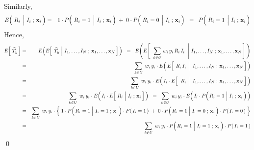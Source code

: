 Similarly,
\begin{eqnarray*}
E\!\left(\,\left.\overset{{\color{white}.}}{R_{i}}\;\,\right\vert\,I_{i}\;;\,\mathbf{x}_{i}\,\right)
& = &
	1 \cdot P\!\left(\,\left.\overset{{\color{white}.}}{R_{i}}=1\;\,\right\vert\,I_{i}\;;\,\mathbf{x}_{i}\,\right)
	\; + \;
	0 \cdot P\!\left(\,\left.\overset{{\color{white}.}}{R_{i}}=0\;\,\right\vert\,I_{i}\;;\,\mathbf{x}_{i}\,\right)
\;\; = \;\;
	P\!\left(\,\left.\overset{{\color{white}.}}{R_{i}}=1\;\,\right\vert\,I_{i}\;;\,\mathbf{x}_{i}\,\right)
\end{eqnarray*}
Hence,
\begin{eqnarray*}
E\!\left[\;\widehat{T}_{y}\,\right]
& = &
	E\!\left(E\!\left[\;
		\left.\widehat{T}_{y}\;\right\vert\,I_{1},\ldots,I_{N}
		\;;\,\mathbf{x}_{1},\ldots,\mathbf{x}_{N}
		\,\right]\,\right)
\;\; = \;\;
	E\!\left(E\!\left[\;\,
		\left.\underset{k \in U}{\sum}\;w_{i}\,y_{i}\,R_{i}\,I_{i}\;\;\right\vert\,I_{1},\ldots,I_{N}
		\;;\,\mathbf{x}_{1},\ldots,\mathbf{x}_{N}
		\,\right]\,\right)
\\
& = &
	\underset{k \in U}{\sum}\;\,w_{i}\,y_{i}
	\cdot
	E\!\left(\,E\!\left[\;
		\left.\overset{{\color{white}.}}{R_{i}\,I_{i}}\;\;\right\vert\,I_{1},\ldots,I_{N}
		\;;\,\mathbf{x}_{1},\ldots,\mathbf{x}_{N}
		\,\right]\,\right)
\\
& = &
	\underset{k \in U}{\sum}\;\,w_{i}\,y_{i}
	\cdot
	E\!\left(\,I_{i} \cdot E\!\left[\;
		\left.\,\overset{{\color{white}.}}{R_{i}}\;\;\right\vert\,I_{1},\ldots,I_{N}
		\;;\,\mathbf{x}_{1},\ldots,\mathbf{x}_{N}
		\,\right]\,\right)
\\
& = &
	\underset{k \in U}{\sum}\;\,w_{i}\,y_{i}
	\cdot
	E\!\left(\,I_{i} \cdot E\!\left[\,
		\left.\overset{{\color{white}.}}{R_{i}}\;\right\vert\,I_{i}
		\;;\,\mathbf{x}_{i}
		\,\right]\,\right)
\;\; = \;\;
	\underset{k \in U}{\sum}\;\,w_{i}\,y_{i}
	\cdot
	E\!\left(\,I_{i} \cdot P\!\left(
		\left.\overset{{\color{white}.}}{R_{i}}=1\;\right\vert\,I_{i}
		\;;\,\mathbf{x}_{i}
		\,\right)\,\right)
\\
& = &
	\underset{k \in U}{\sum}\;\,w_{i}\,y_{i}
	\cdot
	\left\{\;
		1 \cdot P\!\left(\left.
			\overset{{\color{white}.}}{R_{i}}=1\;\right\vert\,I_{i}=1
			\;;\,\mathbf{x}_{i}
			\,\right) \cdot P(\,I_{i}=1\,)
		\; + \;
		0 \cdot P\!\left(\left.
			\overset{{\color{white}.}}{R_{i}}=1\;\right\vert\,I_{i}=0
			\;;\,\mathbf{x}_{i}
			\,\right) \cdot P(\,I_{i}=0\,)
		\;\right\}
\\
& = &
	\underset{k \in U}{\sum}\;\,w_{i}\,y_{i}
	\cdot P\!\left(\left.\overset{{\color{white}.}}{R_{i}}=1\;\right\vert\,I_{i}=1\;;\,\mathbf{x}_{i}\,\right) \cdot P(\,I_{i}=1\,)
\end{eqnarray*}
\qed

